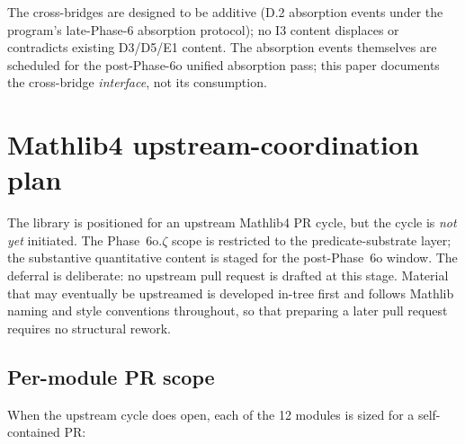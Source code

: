 \documentclass[11pt]{article}
\begin{document}
The cross-bridges are designed to be additive (D.2 absorption
events under the program's late-Phase-6 absorption protocol); no I3
content displaces or contradicts existing D3/D5/E1 content. The
absorption events themselves are scheduled for the post-Phase-6o
unified absorption pass; this paper documents the cross-bridge
\emph{interface}, not its consumption.


\section{Mathlib4 upstream-coordination plan}
\label{sec:mathlib-upstream}

The library is positioned for an upstream Mathlib4 PR cycle, but
the cycle is \emph{not yet} initiated. The Phase~6o.$\zeta$ scope is
restricted to the predicate-substrate layer; the substantive
quantitative content is staged for the post-Phase~6o window. The
deferral is deliberate: no upstream pull request is drafted at this
stage. Material that may eventually be upstreamed is developed in-tree
first and follows Mathlib naming and style conventions throughout, so
that preparing a later pull request requires no structural rework.

\subsection{Per-module PR scope}

When the upstream cycle does open, each of the 12 modules is sized
for a self-contained PR:
\end{document}
